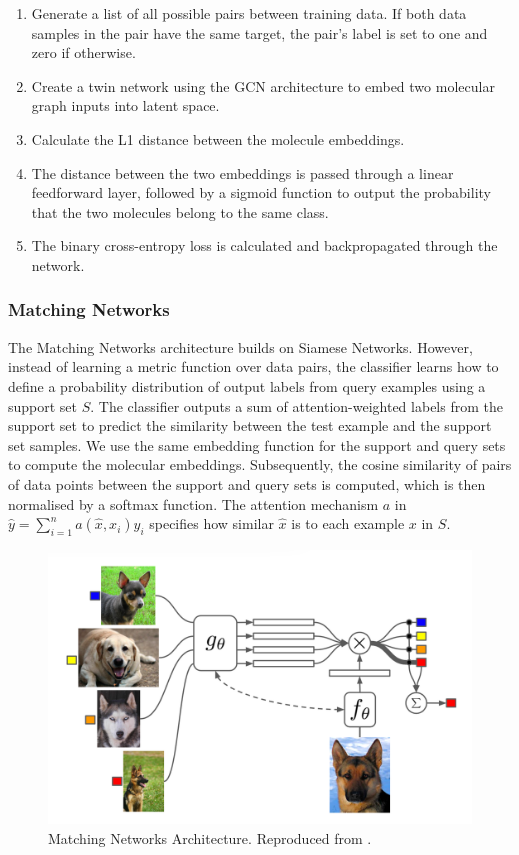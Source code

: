 \begin{enumerate}
    \item Generate a list of all possible pairs between training data. If both data samples in the pair have the same target, the pair's label is set to one and zero if otherwise.
    \item Create a twin network using the GCN architecture to embed two molecular graph inputs into latent space.
    \item Calculate the L1 distance between the molecule embeddings. 
    \item The distance between the two embeddings is passed through a linear feedforward layer, followed by a sigmoid function to output the probability that the two molecules belong to the same class.
    \item The binary cross-entropy loss is calculated and backpropagated through the network.
\end{enumerate}

\subsubsection{Matching Networks}

The Matching Networks architecture builds on Siamese Networks. However, instead of learning a metric function over data pairs, the classifier learns how to define a probability distribution of output labels from query examples using a support set $S$. The classifier outputs a sum of attention-weighted labels from the support set to predict the similarity between the test example and the support set samples. We use the same embedding function for the support and query sets to compute the molecular embeddings. Subsequently, the cosine similarity of pairs of data points between the support and query sets is computed, which is then normalised by a softmax function. The attention mechanism $a$ in $\hat{y} = \sum_{i=1}^{n} a(\hat{x}, x_i)y_i$ specifies how similar $\hat{x}$ is to each example $x$ in $S$.

\begin{figure}[!ht]
    \centering
    \includegraphics[width=0.7\linewidth]{img/matching_networks.png}
    \caption[Matching Networks Architecture]{Matching Networks Architecture. Reproduced from \citet{vinyals2016matching}.}
    \label{fig:matchingnets}
\end{figure}

